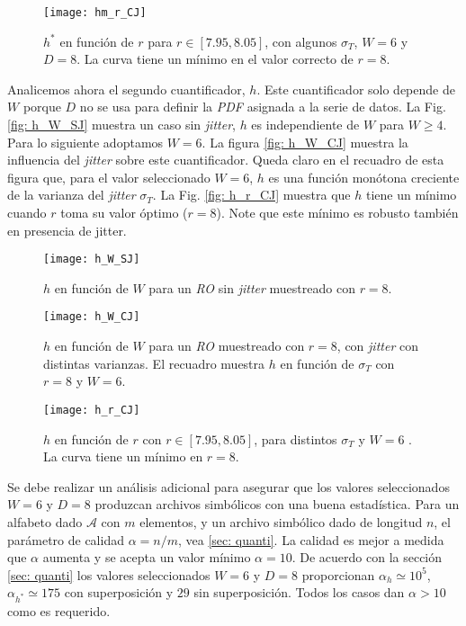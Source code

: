\begin{figure}
\center
\texttt{[image: hm\_r\_CJ]}
\caption{$h^*$ en función de $r$ para $r\in[7.95,8.05]$, con algunos $\sigma_T$, $W=6$ y $D=8$. La curva tiene un mínimo en el valor correcto de $r=8$.}
\label{fig:hm_r_CJ}
\end{figure}

Analicemos ahora el segundo cuantificador, $h$.
Este cuantificador solo depende de $W$ porque $ D $ no se usa para definir la \emph{PDF} asignada a la serie de datos.
La Fig. \ref{fig: h_W_SJ} muestra un caso sin \textit{jitter}, $h$ es independiente de $W$ para $W \ge 4$.
Para lo siguiente adoptamos $W = 6$.
La figura \ref{fig: h_W_CJ} muestra la influencia del \textit{jitter} sobre este cuantificador.
Queda claro en el recuadro de esta figura que, para el valor seleccionado $W = 6$, $h$ es una función monótona creciente de la varianza del \textit{jitter} $\sigma_T$.
La Fig. \ref{fig: h_r_CJ} muestra que $h$ tiene un mínimo cuando $r$ toma su valor óptimo ($r = 8$).
Note que este mínimo es robusto también en presencia de jitter.

\begin{figure}
\center
\texttt{[image: h\_W\_SJ]}
\caption{$h$ en función de $W$ para un \emph{RO} sin \textit{jitter} muestreado con $r=8$.}
\label{fig:h_W_SJ}
\end{figure}

\begin{figure}
\center
\texttt{[image: h\_W\_CJ]}
\caption{$h$ en función de $W$ para un \emph{RO} muestreado con $r=8$, con \textit{jitter} con distintas varianzas. El recuadro muestra $h$ en función de $\sigma_T$ con $r=8$ y $W=6$.}
\label{fig:h_W_CJ}
\end{figure}

\begin{figure}
\center
\texttt{[image: h\_r\_CJ]}
\caption{$h$ en función de $r$ con $r\in[7.95,8.05]$, para distintos $\sigma_T$ y $W=6$ . La curva tiene un mínimo en $r=8$.}
\label{fig:h_r_CJ}
\end{figure}

Se debe realizar un análisis adicional para asegurar que los valores seleccionados $W = 6$ y $D = 8$ produzcan archivos simbólicos con una buena estadística. Para un alfabeto dado $\mathcal{A}$ con $m$ elementos, y un archivo simbólico dado de longitud $n$, el parámetro de calidad $\alpha = n/m$, vea \ref{sec: quanti}.
La calidad es mejor a medida que $\alpha$ aumenta y se acepta un valor mínimo $\alpha = 10$.
De acuerdo con la sección \ref{sec: quanti} los valores seleccionados $W = 6$ y $D = 8$ proporcionan $\alpha_h \simeq 10^5$, $ \alpha_ {h^*} \simeq 175$ con superposición y $29$ sin superposición. Todos los casos dan $\alpha>10$ como es requerido.

